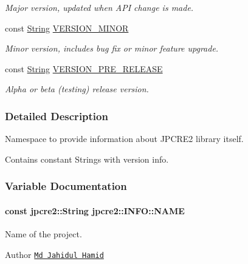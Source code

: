 \begin{DoxyCompactItemize}
\begin{DoxyCompactList}\small\item\em Major version, updated when A\+PI change is made. \end{DoxyCompactList}\item 
const \hyperlink{namespacejpcre2_a91f03070152fb228bc116c5a737f1d16}{String} \hyperlink{namespacejpcre2_1_1INFO_a0644b3b2680e99fc88c0a98f6a0d25d1}{V\+E\+R\+S\+I\+O\+N\+\_\+\+M\+I\+N\+OR}\hypertarget{namespacejpcre2_1_1INFO_a0644b3b2680e99fc88c0a98f6a0d25d1}{}\label{namespacejpcre2_1_1INFO_a0644b3b2680e99fc88c0a98f6a0d25d1}

\begin{DoxyCompactList}\small\item\em Minor version, includes bug fix or minor feature upgrade. \end{DoxyCompactList}\item 
const \hyperlink{namespacejpcre2_a91f03070152fb228bc116c5a737f1d16}{String} \hyperlink{namespacejpcre2_1_1INFO_a85fb46b46141271d426f53b2c2ba6b15}{V\+E\+R\+S\+I\+O\+N\+\_\+\+P\+R\+E\+\_\+\+R\+E\+L\+E\+A\+SE}\hypertarget{namespacejpcre2_1_1INFO_a85fb46b46141271d426f53b2c2ba6b15}{}\label{namespacejpcre2_1_1INFO_a85fb46b46141271d426f53b2c2ba6b15}

\begin{DoxyCompactList}\small\item\em Alpha or beta (testing) release version. \end{DoxyCompactList}\end{DoxyCompactItemize}


\subsubsection{Detailed Description}
Namespace to provide information about J\+P\+C\+R\+E2 library itself. 

Contains constant Strings with version info. 

\subsubsection{Variable Documentation}
\paragraph[{\texorpdfstring{N\+A\+ME}{NAME}}]{\setlength{\rightskip}{0pt plus 5cm}const {\bf jpcre2\+::\+String} jpcre2\+::\+I\+N\+F\+O\+::\+N\+A\+ME}\hypertarget{namespacejpcre2_1_1INFO_a0d5716a82b496f2ccf5eee832275b4b8}{}\label{namespacejpcre2_1_1INFO_a0d5716a82b496f2ccf5eee832275b4b8}


Name of the project. 

\begin{DoxyAuthor}{Author}
\href{https://github.com/neurobin}{\tt Md Jahidul Hamid} 
\end{DoxyAuthor}
